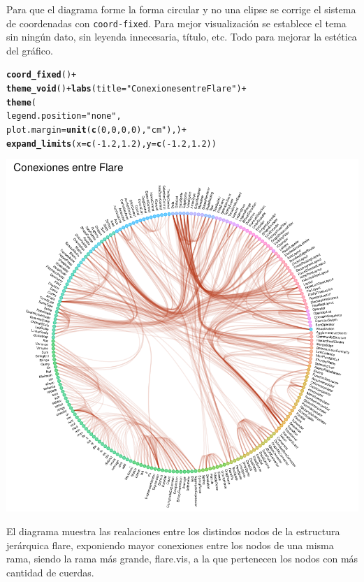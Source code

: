 \documentclass{article}\usepackage[]{graphicx}\usepackage[]{color}
\makeatletter
\def\maxwidth{ %
  \ifdim\Gin@nat@width>\linewidth
    \linewidth
  \else
    \Gin@nat@width
  \fi
}
\newcommand{\hlnum}[1]{\textcolor[rgb]{0.686,0.059,0.569}{#1}}%
\newcommand{\hlstr}[1]{\textcolor[rgb]{0.192,0.494,0.8}{#1}}%
\newcommand{\hlopt}[1]{\textcolor[rgb]{0,0,0}{#1}}%
\newcommand{\hlstd}[1]{\textcolor[rgb]{0.345,0.345,0.345}{#1}}%
\newcommand{\hlkwc}[1]{\textcolor[rgb]{0.333,0.667,0.333}{#1}}%
\newcommand{\hlkwd}[1]{\textcolor[rgb]{0.737,0.353,0.396}{\textbf{#1}}}%
\newenvironment{kframe}{%
 \def\at@end@of@kframe{}%
 \ifinner\ifhmode%
  \def\at@end@of@kframe{\end{minipage}}%
  \begin{minipage}{\columnwidth}%
 \fi\fi%
 \def\FrameCommand##1{\hskip\@totalleftmargin \hskip-\fboxsep
 \colorbox{shadecolor}{##1}\hskip-\fboxsep
     \hskip-\linewidth \hskip-\@totalleftmargin \hskip\columnwidth}%
 \MakeFramed {\advance\hsize-\width
   \@totalleftmargin\z@ \linewidth\hsize
   \@setminipage}}%
 {\par\unskip\endMakeFramed%
 \at@end@of@kframe}
\newenvironment{knitrout}{}{} %
\makeatother
\begin{document}
Para que el diagrama forme la forma circular y no una elipse se corrige el sistema de coordenadas con \texttt{coord-fixed}. Para mejor visualizaci\'on se establece el tema sin ning\'un dato, sin leyenda innecesaria, t\'itulo, etc. Todo para mejorar la est\'etica del gr\'afico.
\begin{knitrout}
\color{fgcolor}\begin{kframe}
\begin{alltt}
    \hlkwd{coord_fixed}\hlstd{()} \hlopt{+}
    \hlkwd{theme_void}\hlstd{()} \hlopt{+} \hlkwd{labs}\hlstd{(}\hlkwc{title} \hlstd{=} \hlstr{"Conexiones entre Flare"}\hlstd{)} \hlopt{+}
    \hlkwd{theme}\hlstd{(}
      \hlkwc{legend.position}\hlstd{=}\hlstr{"none"}\hlstd{,}
      \hlkwc{plot.margin}\hlstd{=}\hlkwd{unit}\hlstd{(}\hlkwd{c}\hlstd{(}\hlnum{0}\hlstd{,}\hlnum{0}\hlstd{,}\hlnum{0}\hlstd{,}\hlnum{0}\hlstd{),}\hlstr{"cm"}\hlstd{),)} \hlopt{+}
    \hlkwd{expand_limits}\hlstd{(}\hlkwc{x} \hlstd{=} \hlkwd{c}\hlstd{(}\hlopt{-}\hlnum{1.2}\hlstd{,} \hlnum{1.2}\hlstd{),} \hlkwc{y} \hlstd{=} \hlkwd{c}\hlstd{(}\hlopt{-}\hlnum{1.2}\hlstd{,} \hlnum{1.2}\hlstd{))}
\end{alltt}
\end{kframe}
\end{knitrout}
\begin{knitrout}
\color{fgcolor}

{\centering \includegraphics[width=\maxwidth]{figure/plot_cue_gg-1} 

}



\end{knitrout}
El diagrama muestra las realaciones entre los distindos nodos de la estructura jer\'arquica flare, exponiendo mayor conexiones entre los nodos de una misma rama, siendo la rama m\'as grande, flare.vis, a la que pertenecen los nodos con m\'as cantidad de cuerdas.
\end{document}
